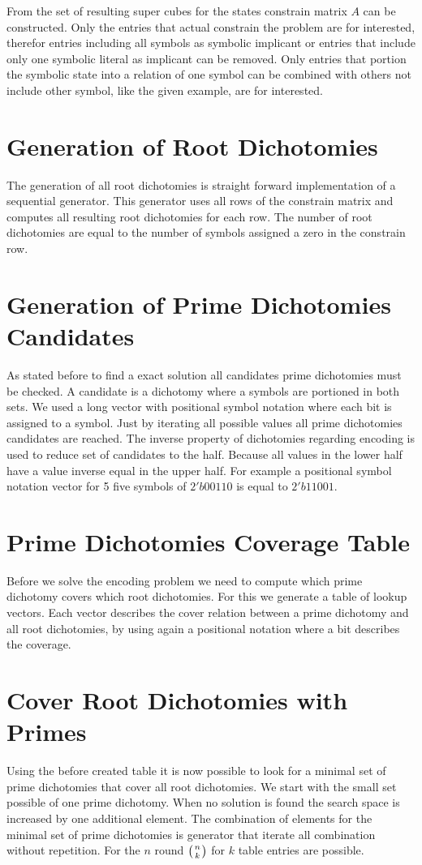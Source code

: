 From the set of resulting super cubes for the states constrain matrix $A$ can be constructed. Only the entries that actual constrain the problem are for interested, therefor entries including all symbols as symbolic implicant or entries that include only one symbolic literal as implicant can be removed. Only entries that portion the symbolic state into a relation of one symbol can be combined with others not include other symbol, like the given example, are for interested. 

\section{Generation of Root Dichotomies}
The generation of all root dichotomies is straight forward implementation of a sequential generator. This generator uses all rows of the constrain matrix and computes all resulting root dichotomies for each row. The number of root dichotomies are equal to the number of symbols assigned a zero in the constrain row.

\section{Generation of Prime Dichotomies Candidates}
As stated before to find a exact solution all candidates prime dichotomies must be checked. A candidate is a dichotomy where a symbols are portioned in both sets. We used a long vector with positional symbol notation where each bit is assigned to a symbol. Just by iterating all possible values all prime dichotomies candidates are reached. The inverse property of dichotomies regarding encoding is used to reduce set of candidates to the half. Because all values in the lower half have a value inverse equal in the upper half. For example a positional symbol notation vector for 5 five symbols of $2'b00110$ is equal to $2'b11001$.

\section{Prime Dichotomies Coverage Table}
Before we solve the encoding problem we need to compute which prime dichotomy covers which root dichotomies. For this we generate a table of lookup vectors. Each vector describes the cover relation between a prime dichotomy and all root dichotomies, by using again a positional notation where a bit describes the coverage.

\section{Cover Root Dichotomies with Primes}
Using the before created table it is now possible to look for a minimal set of prime dichotomies that cover all root dichotomies. We start with the small set possible of one prime dichotomy. When no solution is found the search space is increased by one additional element. The combination of elements for the minimal set of prime dichotomies is generator that iterate all combination without repetition. For the $n$ round $\left( n\atop k \right)$ for $k$ table entries are possible.